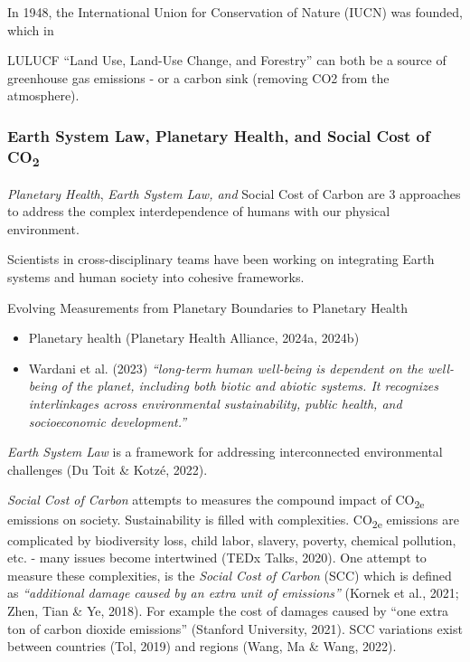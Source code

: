 \documentclass[
  letterpaper,
  DIV=11,
  numbers=noendperiod]{scrartcl}
\begin{document}
In 1948, the International Union for Conservation of Nature (IUCN) was
founded, which in

LULUCF ``Land Use, Land-Use Change, and Forestry'' can both be a source
of greenhouse gas emissions - or a carbon sink (removing CO2 from the
atmosphere).

\subsubsection{\texorpdfstring{Earth System Law, Planetary Health, and
Social Cost of
CO\textsubscript{2}}{Earth System Law, Planetary Health, and Social Cost of CO2}}\label{earth-system-law-planetary-health-and-social-cost-of-co2}

\emph{Planetary Health}, \emph{Earth System Law, and} Social Cost of
Carbon are 3 approaches to address the complex interdependence of humans
with our physical environment.

Scientists in cross-disciplinary teams have been working on integrating
Earth systems and human society into cohesive frameworks.

Evolving Measurements from Planetary Boundaries to Planetary Health

\begin{itemize}
\item
  Planetary health (Planetary Health Alliance, 2024a, 2024b)
\item
  Wardani et al. (2023) \emph{``long-term human well-being is dependent
  on the well-being of the planet, including both biotic and abiotic
  systems. It recognizes interlinkages across environmental
  sustainability, public health, and socioeconomic development.''}
\end{itemize}

\emph{Earth System Law} is a framework for addressing interconnected
environmental challenges (Du Toit \& Kotzé, 2022).

\emph{Social Cost of Carbon} attempts to measures the compound impact of
CO\textsubscript{2e} emissions on society. Sustainability is filled with
complexities. CO\textsubscript{2e} emissions are complicated by
biodiversity loss, child labor, slavery, poverty, chemical pollution,
etc. - many issues become intertwined (TEDx Talks, 2020). One attempt to
measure these complexities, is the \emph{Social Cost of Carbon} (SCC)
which is defined as \emph{``additional damage caused by an extra unit of
emissions''} (Kornek et al., 2021; Zhen, Tian \& Ye, 2018). For example
the cost of damages caused by ``one extra ton of carbon dioxide
emissions'' (Stanford University, 2021). SCC variations exist between
countries (Tol, 2019) and regions (Wang, Ma \& Wang, 2022).
\end{document}
